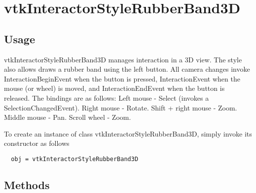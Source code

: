 \section{vtkInteractorStyleRubberBand3D}

\subsection{Usage}

 vtkInteractorStyleRubberBand3D manages interaction in a 3D view.
 The style also allows draws a rubber band using the left button.
 All camera changes invoke InteractionBeginEvent when the button
 is pressed, InteractionEvent when the mouse (or wheel) is moved,
 and InteractionEndEvent when the button is released.  The bindings
 are as follows:
 Left mouse - Select (invokes a SelectionChangedEvent).
 Right mouse - Rotate.
 Shift + right mouse - Zoom.
 Middle mouse - Pan.
 Scroll wheel - Zoom.

To create an instance of class vtkInteractorStyleRubberBand3D, simply
invoke its constructor as follows
\begin{verbatim}
  obj = vtkInteractorStyleRubberBand3D
\end{verbatim}
\subsection{Methods}

